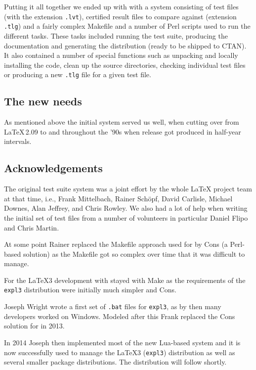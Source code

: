 \documentclass[a4paper]{ltugboat}
\begin{document}
Putting it all together we ended up with with a system consisting of
test files (with the extension \texttt{.lvt}), certified result files
to compare against (extension \texttt{.tlg}) and a fairly complex
Makefile and a number of Perl scripts used to run the different
tasks. These tasks included running the test suite, producing the
documentation and generating the distribution (ready to be shipped to
CTAN). It also contained a number of special functions such as
unpacking and locally installing the code, clean up the source
directories, checking individual test files or producing a new
\texttt{.tlg} file for a given test file.

\subsection{The new needs}

As mentioned above the initial system served us well, when cutting
over from \LaTeX\,2.09 to \LaTeXe{} and throughout the '90s when
\LaTeXe{} release got produced in half-year intervals.


\subsection{Acknowledgements}

The original test suite system was a joint effort by the whole
\LaTeX{} project team at that time, i.e.,
%
Frank Mittelbach,
Rainer Sch\"opf,
David Carlisle,
Michael Downes,
Alan Jeffrey, and
Chris Rowley.
%
We also had a lot of help when writing the initial set of test files from a
number of volunteers in particular Daniel Flipo and Chris Martin.

At some point Rainer replaced the Makefile approach used for \LaTeXe{}
by Cons (a Perl-based solution) as the Makefile got so complex over
time that it was difficult to manage.

For the \LaTeX3 development with stayed with Make as the requirements
of the \texttt{expl3} distribution were initially much simpler and
Cons.

Joseph Wright wrote a first set of \texttt{.bat} files for
\texttt{expl3}, as by then many developers worked on Windows. Modeled
after this Frank replaced the Cons solution for \LaTeXe{} in 2013.

In 2014 Joseph then implemented most of the new Lua-based system and it is
now successfully used to manage the \LaTeX3 (\texttt{expl3})
distribution as well as several smaller package distributions. The
\LaTeXe{} distribution will follow shortly.
\end{document}
